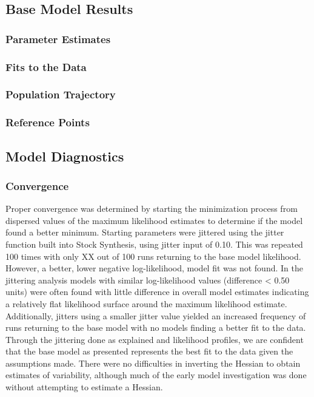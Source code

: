 \documentclass[11pt,
  english,
  letterpaper,
]{article}
\begin{document}
\hypertarget{base-model-results}{%
\subsection{Base Model Results}\label{base-model-results}}

\hypertarget{parameter-estimates}{%
\subsubsection{Parameter Estimates}\label{parameter-estimates}}

\hypertarget{fits-to-the-data}{%
\subsubsection{Fits to the Data}\label{fits-to-the-data}}

\hypertarget{population-trajectory}{%
\subsubsection{Population Trajectory}\label{population-trajectory}}

\hypertarget{reference-points-1}{%
\subsubsection{Reference Points}\label{reference-points-1}}

\hypertarget{model-diagnostics}{%
\subsection{Model Diagnostics}\label{model-diagnostics}}

\hypertarget{convergence}{%
\subsubsection{Convergence}\label{convergence}}

Proper convergence was determined by starting the minimization process from dispersed values of the maximum likelihood estimates to determine if the model found a better minimum. Starting parameters were jittered using the jitter function built into Stock Synthesis, using jitter input of 0.10. This was repeated 100 times with only XX out of 100 runs returning to the base model likelihood. However, a better, lower negative log-likelihood, model fit was not found. In the jittering analysis models with similar log-likelihood values (difference \textless{} 0.50 units) were often found with little difference in overall model estimates indicating a relatively flat likelihood surface around the maximum likelihood estimate. Additionally, jitters using a smaller jitter value yielded an increased frequency of runs returning to the base model with no models finding a better fit to the data. Through the jittering done as explained and likelihood profiles, we are confident that the base model as presented represents the best fit to the data given the assumptions made. There were no difficulties in inverting the Hessian to obtain estimates of variability, although much of the early model investigation was done without attempting to estimate a Hessian.
\end{document}

